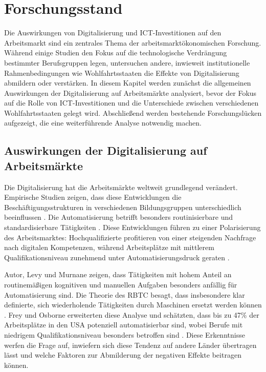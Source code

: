 
\section{Forschungsstand}

Die Auswirkungen von Digitalisierung und \ac{ICT}-Investitionen auf den Arbeitsmarkt sind ein 
zentrales Thema der arbeitsmarktökonomischen Forschung. Während einige Studien den Fokus auf die 
technologische Verdrängung bestimmter Berufsgruppen legen, untersuchen andere, inwieweit 
institutionelle Rahmenbedingungen wie Wohlfahrtsstaaten die Effekte von Digitalisierung abmildern 
oder verstärken. In diesem Kapitel werden zunächst die allgemeinen Auswirkungen der 
Digitalisierung auf Arbeitsmärkte analysiert, bevor der Fokus auf die Rolle von 
\ac{ICT}-Investitionen und die Unterschiede zwischen verschiedenen Wohlfahrtsstaaten gelegt wird. 
Abschließend werden bestehende Forschungslücken aufgezeigt, die eine weiterführende Analyse 
notwendig machen.


\subsection{Auswirkungen der Digitalisierung auf Arbeitsmärkte}

Die Digitalisierung hat die Arbeitsmärkte weltweit grundlegend verändert. Empirische 
Studien zeigen, dass diese Entwicklungen die Beschäftigungsstrukturen in verschiedenen 
Bildungsgruppen unterschiedlich beeinflussen \parencite[vgl.][S. 1589]{autor2013thegrowth}. 
Die Automatisierung betrifft besonders routinisierbare und standardisierbare Tätigkeiten 
\parencite[vgl.][S. 20]{frey2013thefuture}. Diese Entwicklungen führen zu einer 
Polarisierung des Arbeitsmarktes: Hochqualifizierte profitieren von einer steigenden 
Nachfrage nach digitalen Kompetenzen, während Arbeitsplätze mit mittlerem 
Qualifikationsniveau zunehmend unter Automatisierungsdruck geraten
\parencite[vgl.][S. 2509–2510]{goos2014explaining}.

Autor, Levy und Murnane zeigen, dass Tätigkeiten mit hohem Anteil an routinemäßigen
kognitiven und manuellen Aufgaben besonders anfällig für Automatisierung sind. Die Theorie
des \ac{RBTC} besagt, dass insbesondere klar definierte, sich wiederholende Tätigkeiten 
durch Maschinen ersetzt werden können \parencite[vgl.][S. 1281]{autor2003theskill}. Frey 
und Osborne erweiterten diese Analyse und schätzten, dass bis zu 47\% der 
Arbeitsplätze in den USA potenziell automatisierbar sind, wobei Berufe mit niedrigem 
Qualifikationsniveau besonders betroffen sind \parencite[S. 36–38]{frey2013thefuture}. 
Diese Erkenntnisse  werfen die Frage auf, inwiefern sich diese Tendenz auf andere Länder 
übertragen lässt und welche Faktoren zur Abmilderung der negativen Effekte beitragen 
können.

